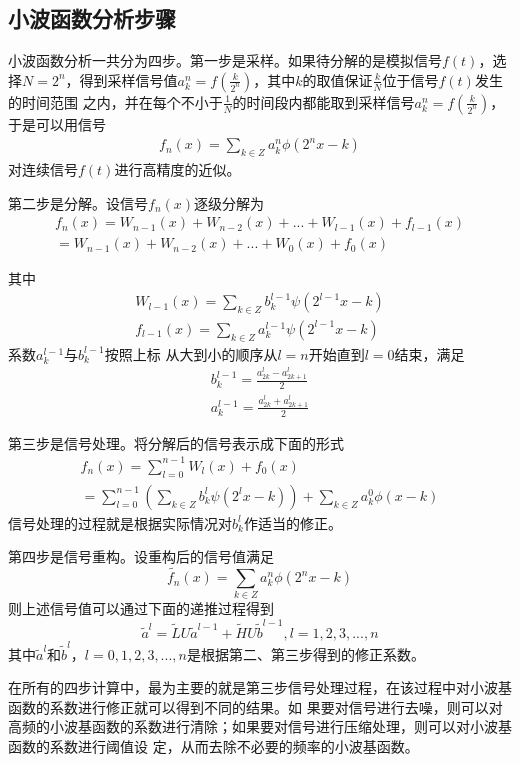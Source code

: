 \subsection{小波函数分析步骤}
小波函数分析一共分为四步\cite{2006matlab}。第一步是采样。如果待分解的是模拟信号$f(t)$，选择$N=2^{n}$，得到采样信号值$a_{k}^{n}=f(\frac{k}{2^{n}})$，其中$k$的取值保证$\frac{k}{N}$位于信号$f(t)$发生的时间范围
之内，并在每个不小于$\frac{1}{N}$的时间段内都能取到采样信号$a_{k}^{n}=f(\frac{k}{2^{n}})$，于是可以用信号
\begin{gather}
f_{n}(x)=\sum_{k\in Z}a_{k}^{n}\phi(2^{n}x-k)
\end{gather}
对连续信号$f(t)$进行高精度的近似。
\par 第二步是分解。设信号$f_{n}(x)$逐级分解为
\begin{gather}
	f_{n}(x)=W_{n-1}(x)+W_{n-2}(x)+...+W_{l-1}(x)+f_{l-1}(x) \nonumber \\
			=W_{n-1}(x)+W_{n-2}(x)+...+W_{0}(x)+f_{0}(x)
\end{gather}
\par 其中
\begin{gather*}
W_{l-1}(x)=\sum_{k\in Z}b_{k}^{l-1}\psi(2^{l-1}x-k)\\
f_{l-1}(x)=\sum_{k\in Z}a_{k}^{l-1}\psi(2^{l-1}x-k)
\end{gather*}
系数$a_{k}^{l-1}$与$b_{k}^{l-1}$按照上标
从大到小的顺序从$l=n$开始直到$l=0$结束，满足
\begin{gather}
	b_{k}^{l-1}=\frac{a_{2k}^{l}-a_{2k+1}^{l}}{2}\\
	a_{k}^{l-1}=\frac{a_{2k}^{l}+a_{2k+1}^{l}}{2}
\end{gather}
\par 第三步是信号处理。将分解后的信号表示成下面的形式
\begin{gather}
	f_{n}(x)=\sum_{l=0}^{n-1}W_{l}(x)+f_{0}(x)\nonumber \\
			=\sum_{l=0}^{n-1}(\sum_{k\in Z}b_{k}^{l}\psi(2^{l}x-k))+\sum_{k\in Z}a_{k}^{0}\phi(x-k)
\end{gather}
信号处理的过程就是根据实际情况对$b_{k}^{l}$作适当的修正。
\par 第四步是信号重构。设重构后的信号值满足
\begin{equation}
	\widetilde{f_{n}}(x)=\sum_{k\in Z}a_{k}^{n}\phi(2^{n}x-k)
\end{equation}
则上述信号值可以通过下面的递推过程得到
\begin{equation}
	\widetilde{a}^{l}=\widetilde{L}U\widetilde{a}^{l-1}+\widetilde{H}U\widetilde{b}^{l-1}, l=1,2,3,...,n
\end{equation}
其中$\widetilde{a}^{l}$和$\widetilde{b}^{l}$，$l=0,1,2,3,...,n$是根据第二、第三步得到的修正系数。\par
在所有的四步计算中，最为主要的就是第三步信号处理过程，在该过程中对小波基函数的系数进行修正就可以得到不同的结果。如
果要对信号进行去噪，则可以对高频的小波基函数的系数进行清除；如果要对信号进行压缩处理，则可以对小波基函数的系数进行阈值设
定，从而去除不必要的频率的小波基函数。

